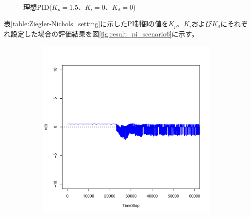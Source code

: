 \documentclass[a4j]{ujarticle}
\begin{document}
\begin{figure}[htbp]
\begin{subfigure}{0.49\hsize}
   \label{subfig:scenario_6_stateBreakdown_86400_345600_1-5_0_0_0_ideal}
 \end{subfigure}
 \caption{理想PID($K_p = 1.5、K_i = 0、K_d = 0$)}
 \label{fig:result_p_scenario6}
\end{figure}
\clearpage
表\ref{table:Ziegler-Nichols_setting}に示したPI制御の値を$K_p$、$K_i$および$K_d$にそれぞれ設定した場合の評価結果を図\ref{fig:result_pi_scenario6}に示す。
\begin{figure}[htbp]
 \centering
 \begin{subfigure}{0.49\hsize}
   \centering
   \includegraphics[width=1.0\hsize]{scenario_6_e_86400_345600_1-35_0-000203_0_0_ideal.pdf}
   \label{subfig:scenario_6_e_86400_345600_1-35_0-000203_0_0_ideal}
 \end{subfigure}
 \begin{subfigure}{0.49\hsize}
   \centering

\end{subfigure}
\end{figure}
\end{document}
